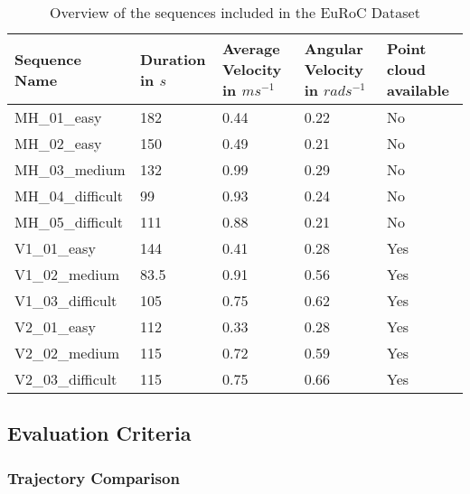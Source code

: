 	\begin{table}
	\caption{Overview of the sequences included in the EuRoC Dataset}
	\begin{tabular}{ |p{3cm}||p{3cm}|p{2cm}|p{2cm}|p{2cm}|}
	\hline
	Sequence Name& Duration in $s$ & Average Velocity in $ms^{-1}$ & Angular Velocity in $rad s^{-1}$ &Point cloud available\\
	\hline
	MH\_01\_easy & 182 & 0.44 & 0.22 & No\\
	MH\_02\_easy & 150 & 0.49 & 0.21 &No\\
	MH\_03\_medium & 132 & 0.99 & 0.29 & No\\
	MH\_04\_difficult & 99 & 0.93 & 0.24 & No\\
	MH\_05\_difficult & 111 & 0.88 & 0.21 & No\\
	V1\_01\_easy & 144 & 0.41 & 0.28 & Yes\\
	V1\_02\_medium & 83.5 & 0.91 & 0.56 & Yes\\
	V1\_03\_difficult & 105 & 0.75 & 0.62 & Yes\\
	V2\_01\_easy & 112 & 0.33 & 0.28 & Yes\\
	V2\_02\_medium & 115 & 0.72 & 0.59 & Yes\\
	V2\_03\_difficult & 115 & 0.75 & 0.66 & Yes\\
	\hline
	\end{tabular}
	\label{table:euroctable}
	\end{table}

\subsection{Evaluation Criteria}
\subsubsection{Trajectory Comparison}\label{poseval}

